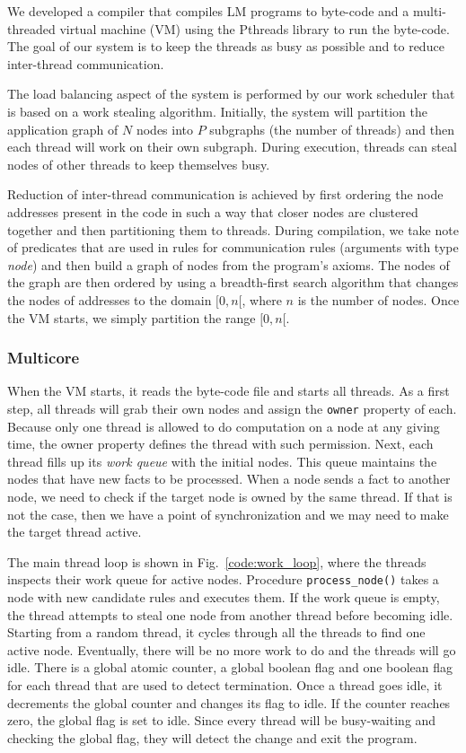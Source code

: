 
We developed a compiler that compiles LM programs to byte-code and a multi-threaded
virtual machine (VM) using the Pthreads library to run the byte-code.
The goal of our system is to keep the threads as busy as possible and to reduce inter-thread communication.

The load balancing aspect of the system is performed by our work scheduler that is based on a work
stealing algorithm. Initially, the system will partition the application
graph of $N$ nodes into $P$ subgraphs (the number of threads) and then each thread will work on their own subgraph.
During execution, threads can steal nodes of other threads to keep themselves busy.

Reduction of inter-thread communication is achieved by first ordering the node addresses present
in the code in such a way that closer nodes are clustered together and then partitioning them
to threads. During compilation, we take note of predicates that are used in rules for
communication rules (arguments with type \emph{node}) and then build a graph of nodes from
the program's axioms. The nodes of the graph are then ordered by using a breadth-first search
algorithm that changes the nodes of addresses to the domain $[0, n[$, where $n$ is the number of
nodes. Once the VM starts, we simply partition the range
$[0, n[$.

\subsubsection{Multicore}

When the VM starts, it reads the byte-code file and starts all threads.
As a first step, all threads will grab their own nodes and assign the \texttt{owner} property of each.
Because only one thread is allowed to do computation on a node at any giving time, the owner property
defines the thread with such permission.
Next, each thread fills up its \emph{work queue} with the initial nodes. This queue
maintains the nodes that have new facts to be processed.
When a node sends a fact to another node, we need to check if the target node is owned by the same thread.
If that is not the case, then we have a point of synchronization and we may need to
make the target thread active.

The main thread loop is shown in Fig.~\ref{code:work_loop}, where the threads
inspects their work queue for active nodes. Procedure \texttt{process\_node()} takes a node with new candidate rules
and executes them. If the work queue is empty, the thread attempts to steal one node from another thread before
becoming idle. Starting from a random thread, it cycles through all the threads to find one active node.
Eventually, there will be no more work to do and the threads will go idle. There is a global atomic counter, a global
boolean flag and one boolean flag for each thread that are used to detect termination.
Once a thread goes idle, it decrements the global counter and changes its flag to idle. If the counter
reaches zero, the global flag is set to idle. Since every thread will be busy-waiting and checking
the global flag, they will detect the change and exit the program.

